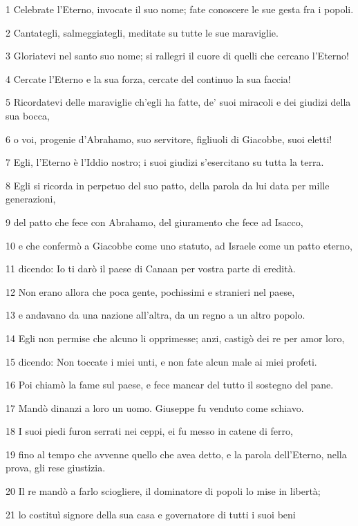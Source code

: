 \par 1 Celebrate l'Eterno, invocate il suo nome; fate conoscere le sue gesta fra i popoli.
\par 2 Cantategli, salmeggiategli, meditate su tutte le sue maraviglie.
\par 3 Gloriatevi nel santo suo nome; si rallegri il cuore di quelli che cercano l'Eterno!
\par 4 Cercate l'Eterno e la sua forza, cercate del continuo la sua faccia!
\par 5 Ricordatevi delle maraviglie ch'egli ha fatte, de' suoi miracoli e dei giudizi della sua bocca,
\par 6 o voi, progenie d'Abrahamo, suo servitore, figliuoli di Giacobbe, suoi eletti!
\par 7 Egli, l'Eterno è l'Iddio nostro; i suoi giudizi s'esercitano su tutta la terra.
\par 8 Egli si ricorda in perpetuo del suo patto, della parola da lui data per mille generazioni,
\par 9 del patto che fece con Abrahamo, del giuramento che fece ad Isacco,
\par 10 e che confermò a Giacobbe come uno statuto, ad Israele come un patto eterno,
\par 11 dicendo: Io ti darò il paese di Canaan per vostra parte di eredità.
\par 12 Non erano allora che poca gente, pochissimi e stranieri nel paese,
\par 13 e andavano da una nazione all'altra, da un regno a un altro popolo.
\par 14 Egli non permise che alcuno li opprimesse; anzi, castigò dei re per amor loro,
\par 15 dicendo: Non toccate i miei unti, e non fate alcun male ai miei profeti.
\par 16 Poi chiamò la fame sul paese, e fece mancar del tutto il sostegno del pane.
\par 17 Mandò dinanzi a loro un uomo. Giuseppe fu venduto come schiavo.
\par 18 I suoi piedi furon serrati nei ceppi, ei fu messo in catene di ferro,
\par 19 fino al tempo che avvenne quello che avea detto, e la parola dell'Eterno, nella prova, gli rese giustizia.
\par 20 Il re mandò a farlo sciogliere, il dominatore di popoli lo mise in libertà;
\par 21 lo costituì signore della sua casa e governatore di tutti i suoi beni
